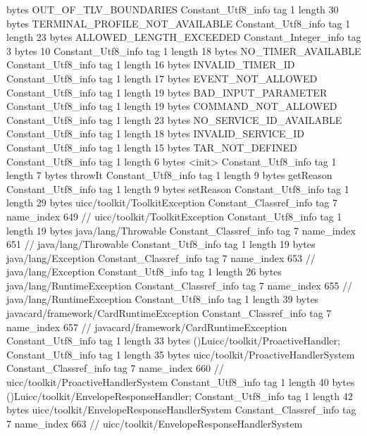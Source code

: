 {{{			bytes	OUT_OF_TLV_BOUNDARIES
		}
		Constant_Utf8_info {
			tag	1
			length	30
			bytes	TERMINAL_PROFILE_NOT_AVAILABLE
		}
		Constant_Utf8_info {
			tag	1
			length	23
			bytes	ALLOWED_LENGTH_EXCEEDED
		}
		Constant_Integer_info {
			tag	3
			bytes	10
		}
		Constant_Utf8_info {
			tag	1
			length	18
			bytes	NO_TIMER_AVAILABLE
		}
		Constant_Utf8_info {
			tag	1
			length	16
			bytes	INVALID_TIMER_ID
		}
		Constant_Utf8_info {
			tag	1
			length	17
			bytes	EVENT_NOT_ALLOWED
		}
		Constant_Utf8_info {
			tag	1
			length	19
			bytes	BAD_INPUT_PARAMETER
		}
		Constant_Utf8_info {
			tag	1
			length	19
			bytes	COMMAND_NOT_ALLOWED
		}
		Constant_Utf8_info {
			tag	1
			length	23
			bytes	NO_SERVICE_ID_AVAILABLE
		}
		Constant_Utf8_info {
			tag	1
			length	18
			bytes	INVALID_SERVICE_ID
		}
		Constant_Utf8_info {
			tag	1
			length	15
			bytes	TAR_NOT_DEFINED
		}
		Constant_Utf8_info {
			tag	1
			length	6
			bytes	<init>
		}
		Constant_Utf8_info {
			tag	1
			length	7
			bytes	throwIt
		}
		Constant_Utf8_info {
			tag	1
			length	9
			bytes	getReason
		}
		Constant_Utf8_info {
			tag	1
			length	9
			bytes	setReason
		}
		Constant_Utf8_info {
			tag	1
			length	29
			bytes	uicc/toolkit/ToolkitException
		}
		Constant_Classref_info {
			tag	7
			name_index	649		// uicc/toolkit/ToolkitException
		}
		Constant_Utf8_info {
			tag	1
			length	19
			bytes	java/lang/Throwable
		}
		Constant_Classref_info {
			tag	7
			name_index	651		// java/lang/Throwable
		}
		Constant_Utf8_info {
			tag	1
			length	19
			bytes	java/lang/Exception
		}
		Constant_Classref_info {
			tag	7
			name_index	653		// java/lang/Exception
		}
		Constant_Utf8_info {
			tag	1
			length	26
			bytes	java/lang/RuntimeException
		}
		Constant_Classref_info {
			tag	7
			name_index	655		// java/lang/RuntimeException
		}
		Constant_Utf8_info {
			tag	1
			length	39
			bytes	javacard/framework/CardRuntimeException
		}
		Constant_Classref_info {
			tag	7
			name_index	657		// javacard/framework/CardRuntimeException
		}
		Constant_Utf8_info {
			tag	1
			length	33
			bytes	()Luicc/toolkit/ProactiveHandler;
		}
		Constant_Utf8_info {
			tag	1
			length	35
			bytes	uicc/toolkit/ProactiveHandlerSystem
		}
		Constant_Classref_info {
			tag	7
			name_index	660		// uicc/toolkit/ProactiveHandlerSystem
		}
		Constant_Utf8_info {
			tag	1
			length	40
			bytes	()Luicc/toolkit/EnvelopeResponseHandler;
		}
		Constant_Utf8_info {
			tag	1
			length	42
			bytes	uicc/toolkit/EnvelopeResponseHandlerSystem
		}
		Constant_Classref_info {
			tag	7
			name_index	663		// uicc/toolkit/EnvelopeResponseHandlerSystem
		}
}}
